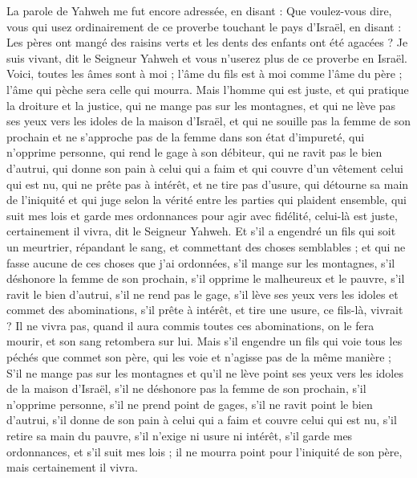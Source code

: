 \begin{multicols}{2}
\VerseOne{}La parole de Yahweh me fut encore adressée, en disant :
Que voulez-vous dire, vous qui usez ordinairement de ce proverbe touchant le pays d'Israël, en disant : Les pères ont mangé des raisins verts et les dents des enfants ont été agacées ?
Je suis vivant, dit le Seigneur Yahweh et vous n'userez plus de ce proverbe en Israël.
Voici, toutes les âmes sont à moi ; l'âme du fils est à moi comme l'âme du père ; l'âme qui pèche sera celle qui mourra.
Mais l'homme qui est juste, et qui pratique la droiture et la justice,
qui ne mange pas sur les montagnes, et qui ne lève pas ses yeux vers les idoles de la maison d'Israël, et qui ne souille pas la femme de son prochain et ne s'approche pas de la femme dans son état d'impureté,
qui n'opprime personne, qui rend le gage à son débiteur, qui ne ravit pas le bien d'autrui, qui donne son pain à celui qui a faim et qui couvre d'un vêtement celui qui est nu,
qui ne prête pas à intérêt, et ne tire pas d'usure, qui détourne sa main de l'iniquité et qui juge selon la vérité entre les parties qui plaident ensemble,
qui suit mes lois et garde mes ordonnances pour agir avec fidélité, celui-là est juste, certainement il vivra, dit le Seigneur Yahweh.
Et s'il a engendré un fils qui soit un meurtrier, répandant le sang, et commettant des choses semblables ;
et qui ne fasse aucune de ces choses que j'ai ordonnées, s'il mange sur les montagnes, s'il déshonore la femme de son prochain,
s'il opprime le malheureux et le pauvre, s'il ravit le bien d'autrui, s'il ne rend pas le gage, s'il lève ses yeux vers les idoles et commet des abominations,
s'il prête à intérêt, et tire une usure, ce fils-là, vivrait ? Il ne vivra pas, quand il aura commis toutes ces abominations, on le fera mourir, et son sang retombera sur lui.
Mais s'il engendre un fils qui voie tous les péchés que commet son père, qui les voie et n'agisse pas de la même manière ;
S'il ne mange pas sur les montagnes et qu'il ne lève point ses yeux vers les idoles de la maison d'Israël, s'il ne déshonore pas la femme de son prochain,
s'il n'opprime personne, s'il ne prend point de gages, s'il ne ravit point le bien d'autrui, s'il donne de son pain à celui qui a faim et couvre celui qui est nu,
s'il retire sa main du pauvre, s'il n'exige ni usure ni intérêt, s'il garde mes ordonnances, et s'il suit mes lois ; il ne mourra point pour l'iniquité de son père, mais certainement il vivra.

\end{multicols}
